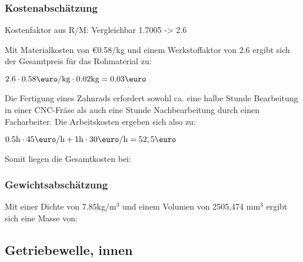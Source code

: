 \documentclass[10pt, a4paper]{article}
\begin{document}
\subsubsection{Kostenabschätzung}
\begin{center}
  Kostenfaktor aus R/M: Vergleichbar 1.7005 -> 2.6 \\
\end{center}
Mit Materialkosten von \euro0.58/kg und einem Werkstoffaktor von 2.6 ergibt sich der Gesamtpreis für das Rohmaterial zu: 
\begin{center}
    $2.6 \cdot 0.58\text{\euro/kg} \cdot 0.02\text{kg} = 0.03\text{\euro}$
\end{center}
Die Fertigung eines Zahnrads erfordert sowohl ca. eine halbe Stunde Bearbeitung in einer CNC-Fräse als auch eine Stunde Nachbearbeitung durch einen Facharbeiter. Die Arbeitskosten ergeben sich also zu:
\begin{center}
  $0.5\text{h} \cdot 45\text{\euro/h} + 1\text{h} \cdot 30\text{\euro/h} = 52,5\text{\euro}$
\end{center}
Somit liegen die Gesamtkosten bei:
\begin{flushright}
\end{flushright}
\subsubsection{Gewichtsabschätzung}
Mit einer Dichte von 7.85kg/m$^3$ und einem Volumen von 2505,474 mm$^3$ ergibt sich eine Masse von:
\begin{flushright}
\end{flushright}

\newpage
\subsection{Getriebewelle, innen}
\begin{figure}[h]
  \centering
  \vspace{-10pt}
\end{figure}
\end{document}
